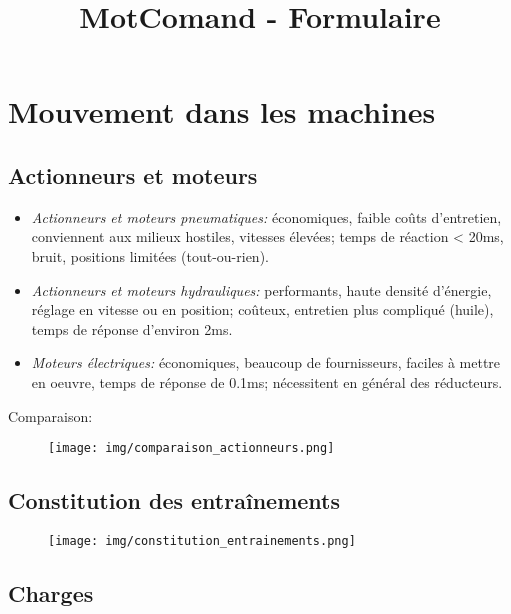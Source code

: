 \documentclass[12pt, twocolumn]{article}
\title{MotComand - Formulaire}
\begin{document}
	\maketitle
	
		\section*{Mouvement dans les machines}
		
			\subsection*{Actionneurs et moteurs}
	
				\begin{itemize}
					\item \emph{Actionneurs et moteurs pneumatiques:} économiques, faible coûts d'entretien, conviennent aux milieux hostiles, vitesses élevées; temps de réaction < 20ms, bruit, positions limitées (tout-ou-rien).
					\item \emph{Actionneurs et moteurs hydrauliques:} performants, haute densité d'énergie, réglage en vitesse ou en position; coûteux, entretien plus compliqué (huile), temps de réponse d'environ 2ms.
					\item \emph{Moteurs électriques:} économiques, beaucoup de fournisseurs, faciles à mettre en oeuvre, temps de réponse de 0.1ms; nécessitent en général des réducteurs.
				\end{itemize}
				
				Comparaison:
				
				\begin{figure}[H]
					\texttt{[image: img/comparaison\_actionneurs.png]}
					\centering
				\end{figure}
			
			\subsection*{Constitution des entraînements}
				
				\begin{figure}[H]
					\texttt{[image: img/constitution\_entrainements.png]}
					\centering
				\end{figure}
				
			\subsection*{Charges}
				
\end{document}
